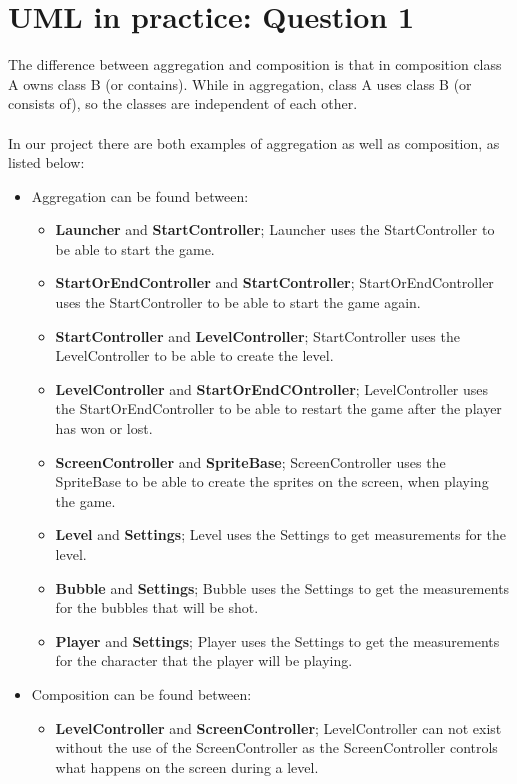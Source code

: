 \chapter{UML in practice: Question 1}

The difference between aggregation and composition is that in composition class A owns class B (or contains). While in aggregation, class A uses class B (or consists of), so the classes are independent of each other. 
\\\\
In our project there are both examples of aggregation as well as composition, as listed below:

\begin{itemize}
\itemsep0em 
\item Aggregation can be found between:
	\begin{itemize}
	\itemsep0em
	\item \textbf{Launcher} and \textbf{StartController}; Launcher uses the StartController to be able to start the game.	
	\item \textbf{StartOrEndController} and \textbf{StartController}; StartOrEndController uses the StartController to be able to start the game again.
	\item \textbf{StartController} and \textbf{LevelController}; StartController uses the LevelController to be able to create the level. 
	\item \textbf{LevelController} and \textbf{StartOrEndCOntroller}; LevelController uses the StartOrEndController to be able to restart the game after the player has won or lost.
	\item \textbf{ScreenController} and \textbf{SpriteBase}; ScreenController uses the SpriteBase to be able to create the sprites on the screen, when playing the game.
	\item \textbf{Level} and \textbf{Settings}; Level uses the Settings to get measurements for the level.
	\item \textbf{Bubble} and \textbf{Settings}; Bubble uses the Settings to get the measurements for the bubbles that will be shot. 
	\item \textbf{Player} and \textbf{Settings}; Player uses the Settings to get the measurements for the character that the player will be playing.
	\end{itemize}
\item Composition can be found between:
	\begin{itemize}
	\itemsep0em
	\item \textbf{LevelController} and \textbf{ScreenController}; LevelController can not exist without the use of the ScreenController as the ScreenController controls what happens on the screen during a level.

\end{itemize}
\end{itemize}
